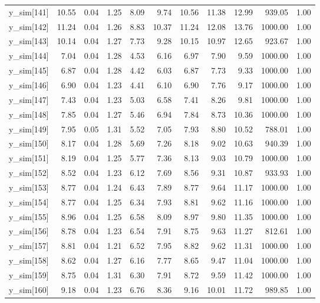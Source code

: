 \begin{table}[ht]
\begin{tabular}{rrrrrrrrrrr}
  y\_sim[141] & 10.55 & 0.04 & 1.25 & 8.09 & 9.74 & 10.56 & 11.38 & 12.99 & 939.05 & 1.00 \\ 
  y\_sim[142] & 11.24 & 0.04 & 1.26 & 8.83 & 10.37 & 11.24 & 12.08 & 13.76 & 1000.00 & 1.00 \\ 
  y\_sim[143] & 10.14 & 0.04 & 1.27 & 7.73 & 9.28 & 10.15 & 10.97 & 12.65 & 923.67 & 1.00 \\ 
  y\_sim[144] & 7.04 & 0.04 & 1.28 & 4.53 & 6.16 & 6.97 & 7.90 & 9.59 & 1000.00 & 1.00 \\ 
  y\_sim[145] & 6.87 & 0.04 & 1.28 & 4.42 & 6.03 & 6.87 & 7.73 & 9.33 & 1000.00 & 1.00 \\ 
  y\_sim[146] & 6.90 & 0.04 & 1.23 & 4.41 & 6.10 & 6.90 & 7.76 & 9.17 & 1000.00 & 1.00 \\ 
  y\_sim[147] & 7.43 & 0.04 & 1.23 & 5.03 & 6.58 & 7.41 & 8.26 & 9.81 & 1000.00 & 1.00 \\ 
  y\_sim[148] & 7.85 & 0.04 & 1.27 & 5.46 & 6.94 & 7.84 & 8.73 & 10.36 & 1000.00 & 1.00 \\ 
  y\_sim[149] & 7.95 & 0.05 & 1.31 & 5.52 & 7.05 & 7.93 & 8.80 & 10.52 & 788.01 & 1.00 \\ 
  y\_sim[150] & 8.17 & 0.04 & 1.28 & 5.69 & 7.26 & 8.18 & 9.02 & 10.63 & 940.39 & 1.00 \\ 
  y\_sim[151] & 8.19 & 0.04 & 1.25 & 5.77 & 7.36 & 8.13 & 9.03 & 10.79 & 1000.00 & 1.00 \\ 
  y\_sim[152] & 8.52 & 0.04 & 1.23 & 6.12 & 7.69 & 8.56 & 9.31 & 10.87 & 933.93 & 1.00 \\ 
  y\_sim[153] & 8.77 & 0.04 & 1.24 & 6.43 & 7.89 & 8.77 & 9.64 & 11.17 & 1000.00 & 1.00 \\ 
  y\_sim[154] & 8.77 & 0.04 & 1.25 & 6.34 & 7.93 & 8.81 & 9.62 & 11.16 & 1000.00 & 1.00 \\ 
  y\_sim[155] & 8.96 & 0.04 & 1.25 & 6.58 & 8.09 & 8.97 & 9.80 & 11.35 & 1000.00 & 1.00 \\ 
  y\_sim[156] & 8.78 & 0.04 & 1.23 & 6.54 & 7.91 & 8.75 & 9.63 & 11.27 & 812.61 & 1.00 \\ 
  y\_sim[157] & 8.81 & 0.04 & 1.21 & 6.52 & 7.95 & 8.82 & 9.62 & 11.31 & 1000.00 & 1.00 \\ 
  y\_sim[158] & 8.62 & 0.04 & 1.27 & 6.16 & 7.77 & 8.65 & 9.47 & 11.04 & 1000.00 & 1.00 \\ 
  y\_sim[159] & 8.75 & 0.04 & 1.31 & 6.30 & 7.91 & 8.72 & 9.59 & 11.42 & 1000.00 & 1.00 \\ 
  y\_sim[160] & 9.18 & 0.04 & 1.23 & 6.76 & 8.36 & 9.16 & 10.01 & 11.72 & 989.85 & 1.00 \\ 

\end{tabular}
\end{table}
